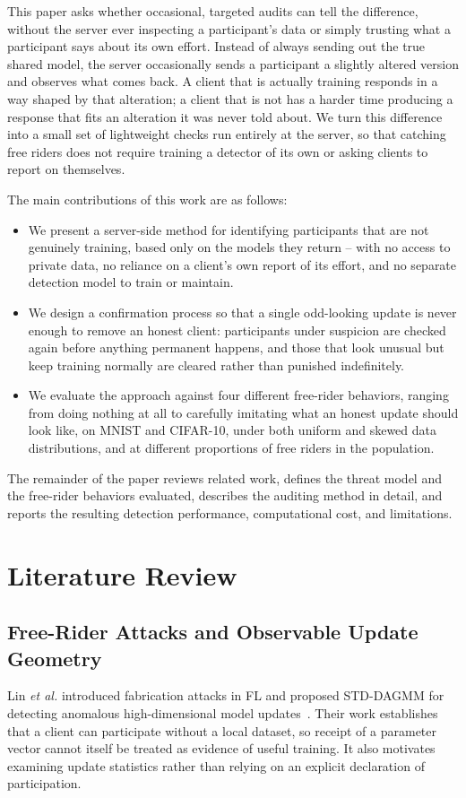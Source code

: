 \documentclass[conference]{IEEEtran}
\begin{document}
This paper asks whether occasional, targeted audits can tell the difference,
without the server ever inspecting a participant's data or simply trusting
what a participant says about its own effort. Instead of always sending out
the true shared model, the server occasionally sends a participant a
slightly altered version and observes what comes back. A client that is
actually training responds in a way shaped by that alteration; a client that
is not has a harder time producing a response that fits an alteration it was
never told about. We turn this difference into a small set of lightweight
checks run entirely at the server, so that catching free riders does not
require training a detector of its own or asking clients to report on
themselves.

The main contributions of this work are as follows:
\begin{itemize}[leftmargin=*,nosep]
\item We present a server-side method for identifying participants that are
not genuinely training, based only on the models they return -- with no
access to private data, no reliance on a client's own report of its effort,
and no separate detection model to train or maintain.
\item We design a confirmation process so that a single odd-looking update
is never enough to remove an honest client: participants under suspicion are
checked again before anything permanent happens, and those that look unusual
but keep training normally are cleared rather than punished indefinitely.
\item We evaluate the approach against four different free-rider behaviors,
ranging from doing nothing at all to carefully imitating what an honest
update should look like, on MNIST and CIFAR-10, under both uniform and
skewed data distributions, and at different proportions of free riders in
the population.
\end{itemize}

The remainder of the paper reviews related work, defines the threat model
and the free-rider behaviors evaluated, describes the auditing method in
detail, and reports the resulting detection performance, computational cost,
and limitations.
\section{Literature Review}
\subsection{Free-Rider Attacks and Observable Update Geometry}
Lin \emph{et al.} introduced fabrication attacks in FL and proposed STD-DAGMM
for detecting anomalous high-dimensional model updates~\cite{lin2019freeriders}.
Their work establishes that a client can participate without a local dataset,
so receipt of a parameter vector cannot itself be treated as evidence of useful
training. It also motivates examining update statistics rather than relying on
an explicit declaration of participation.
\end{document}
